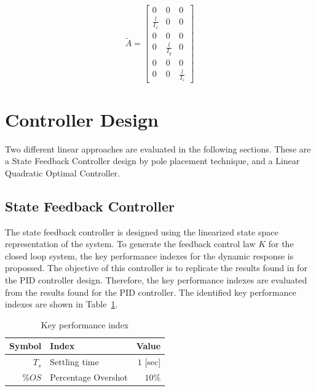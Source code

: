 \documentclass[12pt]{article}
\begin{document}
\begin{equation}
\tilde{A} = 
\begin{bmatrix}
0 & 0 & 0 \\ 
\frac{l}{I_x} & 0 & 0 \\
0 & 0 & 0 \\ 
0 & \frac{l}{I_y} & 0 \\
0 & 0 & 0 \\ 
0 & 0 & \frac{l}{I_z}
\end{bmatrix}
\end{equation}

\section{Controller Design}

Two different linear approaches are evaluated in the following sections. These are a State Feedback Controller design by pole placement technique, and a Linear Quadratic Optimal Controller.

\subsection{State Feedback Controller}
\label{sec:state-feedback}

The state feedback controller is designed using the linearized state space representation of the system. To generate the feedback control law $K$ for the closed loop system, the key performance indexes for the dynamic response is propossed. The objective of this controller is to replicate the results found in \cite{Boua04} for the PID controller design. Therefore, the key performance indexes are evaluated from the results found for the PID controller. The identified key performance indexes are shown in Table~\ref{tab:KPI}.



\begin{table}
  \begin{center}
    \caption{Key performance index}
    \label{tab:KPI}
    \begin{tabular}{rlr}
      \hline
      Symbol & Index & Value \\
      \hline                  
      $T_s$ & Settling time & $1$ [sec]\\
      $\%OS$ & Percentage Overshot & $10\%$\\
      \hline
    \end{tabular}
  \end{center}
\end{table}
\end{document}

